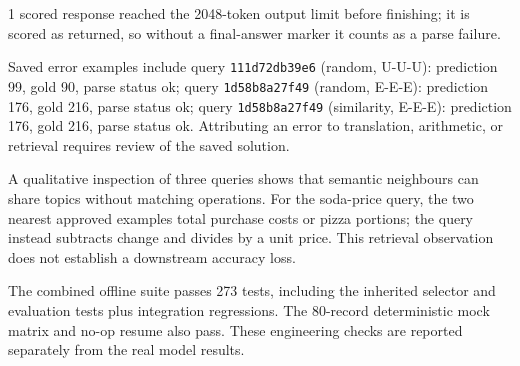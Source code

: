 1 scored response reached the 2048-token output limit before finishing; it is scored as returned, so without a final-answer marker it counts as a parse failure.

Saved error examples include query \texttt{111d72db39e6} (random, U-U-U): prediction 99, gold 90, parse status ok; query \texttt{1d58b8a27f49} (random, E-E-E): prediction 176, gold 216, parse status ok; query \texttt{1d58b8a27f49} (similarity, E-E-E): prediction 176, gold 216, parse status ok. Attributing an error to translation, arithmetic, or retrieval requires review of the saved solution.

A qualitative inspection of three queries shows that semantic neighbours can share topics without matching operations. For the soda-price query, the two nearest approved examples total purchase costs or pizza portions; the query instead subtracts change and divides by a unit price. This retrieval observation does not establish a downstream accuracy loss.

The combined offline suite passes 273 tests, including the inherited selector and evaluation tests plus integration regressions. The 80-record deterministic mock matrix and no-op resume also pass. These engineering checks are reported separately from the real model results.
